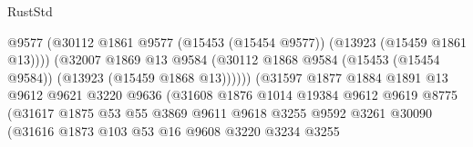 \begin{lexlean}{RustStd}
\begin{coremodule}
                                            @9577
                                            (@30112
                                              @1861
                                              @9577
                                              (@15453 (@15454 @9577))
                                              (@13923 (@15459 @1861 @13))))
                                          (@32007
                                            @1869
                                            @13
                                            @9584
                                            (@30112
                                              @1868
                                              @9584
                                              (@15453 (@15454 @9584))
                                              (@13923 (@15459 @1868 @13))))))
                                      (@31597
                                        @1877
                                        @1884
                                        @1891
                                        @13
                                        @9612
                                        @9621
                                        @3220
                                        @9636
                                        (@31608
                                          @1876
                                          @1014
                                          @19384
                                          @9612
                                          @9619
                                          @8775
                                          (@31617
                                            @1875
                                            @53
                                            @55
                                            @3869
                                            @9611
                                            @9618
                                            @3255
                                            @9592
                                            @3261
                                            @30090
                                            (@31616
                                              @1873
                                              @103
                                              @53
                                              @16
                                              @9608
                                              @3220
                                              @3234
                                              @3255

\end{coremodule}
\end{lexlean}
